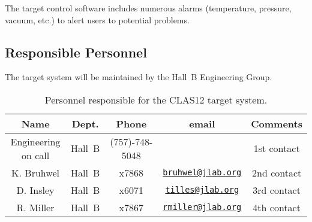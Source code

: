 The target control software includes numerous alarms (temperature, pressure, 
vacuum, etc.) to alert users to potential problems. 

\subsection{Responsible Personnel}

The target system will be maintained by the Hall~B Engineering Group.  

\begin{table}[!htb]
\centering
\begin{tabular}{|c|c|c|c|c|}
\hline
 Name&Dept.&Phone&email&Comments \\ \hline
Engineering on call & Hall~B&(757)-748-5048&& 1st contact  \\ \hline
K. Bruhwel& Hall~B&x7868&\href{mailto:bruhwel@jlab.org}{\nolinkurl{bruhwel@jlab.org}}&2nd contact \\ \hline
D. Insley & Hall~B&x6071&\href{mailto:tilles@jlab.org}{\nolinkurl{tilles@jlab.org}}  &3rd contact \\ \hline
R. Miller &Hall~B&x7867&\href{mailto:rmiller@jlab.org}{\nolinkurl{rmiller@jlab.org}} &4th contact \\ \hline
\end{tabular}
\caption{Personnel responsible for the CLAS12 target system.} 
\label{tb:target}
\end{table}
